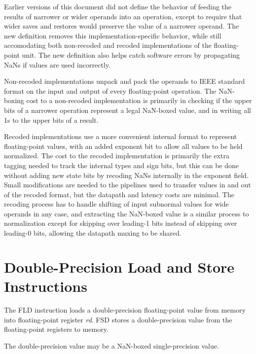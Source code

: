 \begin{commentary}
Earlier versions of this document did not define the behavior of
feeding the results of narrower or wider operands into an operation,
except to require that wider saves and restores would preserve the
value of a narrower operand.  The new definition removes this
implementation-specific behavior, while still accomodating both
non-recoded and recoded implementations of the floating-point unit.
The new definition also helps catch software errors by propagating
NaNs if values are used incorrectly.

Non-recoded implementations unpack and pack the operands to IEEE
standard format on the input and output of every floating-point
operation.  The NaN-boxing cost to a non-recoded implementation is
primarily in checking if the upper bits of a narrower operation
represent a legal NaN-boxed value, and in writing all 1s to the upper
bits of a result.

Recoded implementations use a more convenient internal format to
represent floating-point values, with an added exponent bit to allow
all values to be held normalized.  The cost to the recoded
implementation is primarily the extra tagging needed to track the
internal types and sign bits, but this can be done without adding new
state bits by recoding NaNs internally in the exponent field.  Small
modifications are needed to the pipelines used to transfer values in
and out of the recoded format, but the datapath and latency costs are
minimal.  The recoding process has to handle shifting of input
subnormal values for wide operands in any case, and extracting the
NaN-boxed value is a similar process to normalization except for
skipping over leading-1 bits instead of skipping over leading-0 bits,
allowing the datapath muxing to be shared.
\end{commentary}

\section{Double-Precision Load and Store Instructions}

The FLD instruction loads a double-precision floating-point value from
memory into floating-point register {\em rd}.  FSD stores a double-precision
value from the floating-point registers to memory.
\begin{commentary}
The double-precision value may be a NaN-boxed single-precision value.
\end{commentary}

